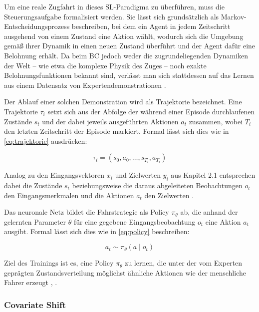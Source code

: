 Um eine reale Zugfahrt in dieses \gls{SL}-Paradigma zu überführen, muss die Steuerungsaufgabe formalisiert werden. 
Sie lässt sich grundsätzlich als Markov-Entscheidungsprozess beschreiben, bei dem ein Agent in jedem Zeitschritt ausgehend von einem Zustand eine Aktion wählt, wodurch sich die Umgebung gemäß ihrer Dynamik in einen neuen Zustand überführt und der Agent dafür eine Belohnung erhält. 
Da beim \gls{BC} jedoch weder die zugrundeliegenden Dynamiken der Welt -- wie etwa die komplexe Physik des Zuges -- noch exakte Belohnungsfunktionen bekannt sind, verlässt man sich stattdessen auf das Lernen aus einem Datensatz von Expertendemonstrationen \cite[vgl.~S.~2]{chap2_Kar25}.

Der Ablauf einer solchen Demonstration wird als Trajektorie bezeichnet. 
Eine Trajektorie $\tau_i$ setzt sich aus der Abfolge der während einer Episode durchlaufenen Zustände $s_t$ und der dabei jeweils ausgeführten Aktionen $a_t$ zusammen, wobei $T_i$ den letzten Zeitschritt der Episode markiert. 
Formal lässt sich dies wie in \autoref{eq:trajektorie} ausdrücken:

\begin{equation} \label{eq:trajektorie}
\tau_i = (s_0, a_0, \dots, s_{T_i}, a_{T_i})
\end{equation}
 
Analog zu den Eingangsvektoren $x_i$ und Zielwerten $y_i$ aus Kapitel 2.1 entsprechen dabei die Zustände $s_t$ beziehungsweise die daraus abgeleiteten Beobachtungen $o_t$ den Eingangsmerkmalen und die Aktionen $a_t$ den Zielwerten \cite[vgl.~S.~4]{chap2_Are20}.

Das neuronale Netz bildet die Fahrstrategie als Policy $\pi_\theta$ ab, die anhand der gelernten Parameter $\theta$ für eine gegebene Eingangsbeobachtung $o_t$ eine Aktion $a_t$ ausgibt. 
Formal lässt sich dies wie in \autoref{eq:policy} beschreiben:

\begin{equation} \label{eq:policy}
a_t \sim \pi_\theta(a \mid o_t)
\end{equation}

Ziel des Trainings ist es, eine Policy $\pi_\theta$ zu lernen, die unter der vom Experten geprägten Zustandsverteilung möglichst ähnliche Aktionen wie der menschliche Fahrer erzeugt \cite[vgl.~S.~2f.]{chap2_Ros10}, \cite[vgl.~S.~2]{chap2_Kar25}.

\subsubsection{Covariate Shift}
\label{sec:covariate_shift}

